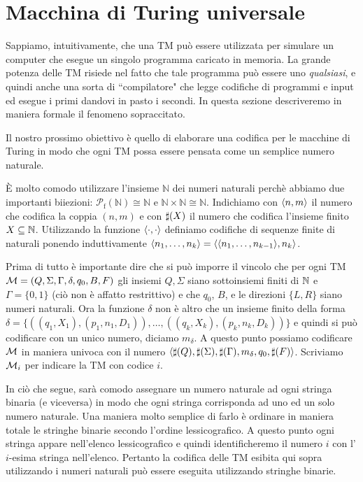 \documentclass[runningheads,a4paper]{llncs}
\begin{document}
\section{Macchina di Turing universale}

Sappiamo, intuitivamente, che una TM pu\`{o} essere utilizzata per simulare un computer che esegue un singolo programma caricato in memoria. La grande potenza delle TM risiede nel fatto che tale programma pu\`{o} essere uno \emph{qualsiasi}, e quindi anche una sorta di ``compilatore" che legge codifiche di programmi e input ed esegue i primi dandovi in pasto i secondi. In questa sezione descriveremo in maniera formale il fenomeno sopraccitato.

Il nostro prossimo obiettivo \`{e} quello di elaborare una codifica per le macchine di Turing in modo che ogni TM possa essere pensata come un semplice numero naturale. 

\`{E} molto comodo utilizzare l'insieme $\mathbb{N}$ dei numeri naturali perch\`{e} abbiamo due importanti biiezioni: $\mathcal{P}_{\mathrm{f}}(\mathbb{N}) \cong \mathbb{N}$ e $\mathbb{N} \times \mathbb{N} \cong \mathbb{N}$. Indichiamo con $\langle n,m \rangle$ il numero che codifica la coppia $(n,m)$ e con $\sharp(X)$ il numero che codifica l'insieme finito $X \subseteq \mathbb{N}$. Utilizzando la funzione $\langle \cdot,\cdot \rangle$ definiamo codifiche di sequenze finite di naturali ponendo induttivamente $\langle n_1,\ldots,n_k \rangle = \langle \langle n_1,\ldots,n_{k-1}\rangle,n_k \rangle$.

Prima di tutto \`{e} importante dire che si pu\`{o} imporre il vincolo che per ogni TM $\mathcal{M}=(Q,\Sigma,\Gamma,\delta,q_0,B,F)$ gli insiemi $Q,\Sigma$ siano sottoinsiemi finiti di $\mathbb{N}$ e $\Gamma = \{0,1\}$ (ci\`{o} non \`{e} affatto restrittivo) e che $q_0$, $B$, e le direzioni  $\{L,R\}$ siano numeri naturali. Ora la funzione $\delta$ non \`{e} altro che un insieme finito della forma $\delta = \{((q_1,X_1),(p_1,n_1,D_1)),\ldots,((q_k,X_k),(p_k,n_k,D_k))\}$ e quindi si pu\`{o} codificare con un unico numero, diciamo $m_\delta$. A questo punto possiamo codificare $\mathcal{M}$ in maniera univoca con il numero $\langle \sharp(Q),\sharp(\Sigma),\sharp(\Gamma),m_\delta,q_0,\sharp(F)\rangle$. Scriviamo $\mathcal{M}_i$ per indicare la TM con codice $i$.

In ci\`{o} che segue, sar\`{a} comodo assegnare un numero naturale ad ogni stringa binaria (e viceversa) in modo che ogni stringa corrisponda ad uno ed un solo numero naturale. Una maniera molto semplice di farlo \`{e} ordinare in maniera totale le stringhe binarie secondo l'ordine lessicografico. A questo punto ogni stringa appare nell'elenco lessicografico e quindi identificheremo il numero $i$ con l'$i$-esima stringa nell'elenco. Pertanto la codifica delle TM esibita qui sopra utilizzando i numeri naturali pu\`{o} essere eseguita utilizzando stringhe binarie.
\end{document}
